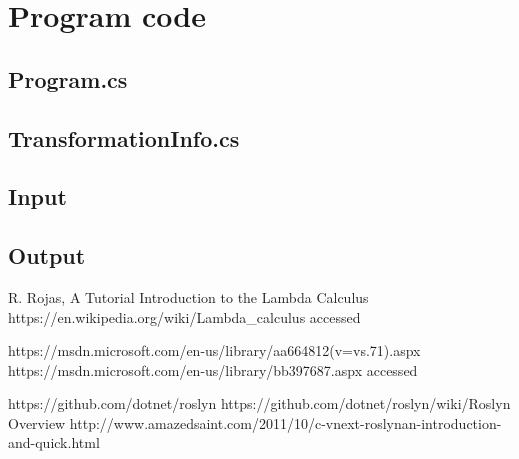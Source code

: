 \documentclass[]{report}
\begin{document}
    \pagebreak

    \section{Program code}

   \subsection{Program.cs}


    
    \pagebreak
    \subsection{TransformationInfo.cs}
    
    \pagebreak
    \subsection{Input}\label{testsInput}
        
            \pagebreak
    \subsection{Output}\label{testsOutput}
          
                  
    
    
\begin{thebibliography}{80}
     R. Rojas, A Tutorial Introduction to the Lambda Calculus
     https://en.wikipedia.org/wiki/Lambda\_calculus accessed \date{01.05.2017}
     https://msdn.microsoft.com/en-us/library/aa664812(v=vs.71).aspx
     https://msdn.microsoft.com/en-us/library/bb397687.aspx
    accessed \date{01.05.2017}
     https://github.com/dotnet/roslyn
     https://github.com/dotnet/roslyn/wiki/Roslyn Overview
     http://www.amazedsaint.com/2011/10/c-vnext-roslynan-introduction-and-quick.html
    

\end{thebibliography}
\end{document}
